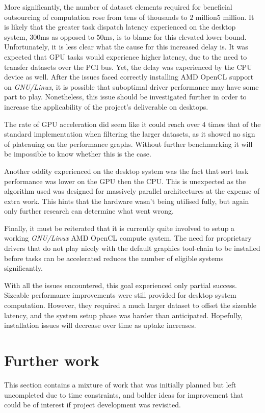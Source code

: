 More significantly, the number of dataset elements required for beneficial outsourcing of computation rose from tens of thousands to $2$ million\textendash$5$ million. It is likely that the greater task dispatch latency experienced on the desktop system, $300$ms as opposed to $50$ms, is to blame for this elevated lower-bound. Unfortunately, it is less clear what the cause for this increased delay is. It was expected that \ac{GPU} tasks would experience higher latency, due to the need to transfer datasets over the \ac{PCI} bus. Yet, the delay was experienced by the \ac{CPU} device as well. After the issues faced correctly installing \ac{AMD} \ac{OpenCL} support on \emph{GNU/Linux}, it is possible that suboptimal driver performance may have some part to play. Nonetheless, this issue should be investigated further in order to increase the applicability of the project's deliverable on desktops.

The rate of \ac{GPU} acceleration did seem like it could reach over $4$ times that of the standard implementation when filtering the larger datasets, as it showed no sign of plateauing on the performance graphs. Without further benchmarking it will be impossible to know whether this is the case.

Another oddity experienced on the desktop system was the fact that sort task performance was lower on the \ac{GPU} then the \ac{CPU}. This is unexpected as the algorithm used was designed for massively parallel architectures at the expense of extra work. This hints that the hardware wasn't being utilised fully, but again only further research can determine what went wrong.

Finally, it must be reiterated that it is currently quite involved to setup a working \emph{GNU/Linux} \ac{AMD} \ac{OpenCL} compute system. The need for proprietary drivers that do not play nicely with the default graphics tool-chain to be installed before tasks can be accelerated reduces the number of eligible systems significantly.

With all the issues encountered, this goal experienced only partial success. Sizeable performance improvements were still provided for desktop system computation. However, they required a much larger dataset to offset the sizeable latency, and the system setup phase was harder than anticipated. Hopefully, installation issues will decrease over time as uptake increases.

\section{Further work}
This section contains a mixture of work that was initially planned but left uncompleted due to time constraints, and bolder ideas for improvement that could be of interest if project development was revisited.

